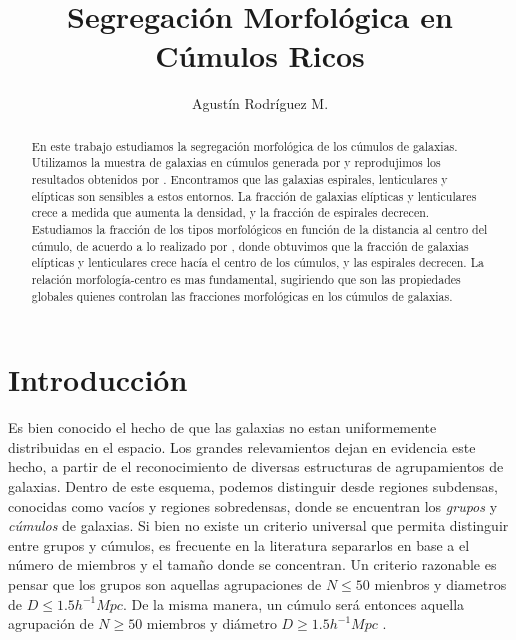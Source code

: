 \documentclass[a4paper,10pt]{article}
\title{Segregaci\'on Morfol\'ogica en C\'umulos Ricos}
\author{Agustín Rodríguez M.}
\begin{document}
\maketitle

\begin{abstract}

En este trabajo estudiamos la segregaci\'on morfol\'ogica de los c\'umulos de galaxias. Utilizamos la muestra de galaxias en c\'umulos generada por \citet{Dressler1980.catalogo} y reprodujimos los resultados obtenidos por \citet{Dressler1980}. Encontramos que las galaxias espirales, lenticulares y el\'ipticas son sensibles a estos entornos. La fracci\'on de galaxias el\'ipticas y lenticulares crece a medida que aumenta la densidad, y la fracci\'on de espirales decrecen.
Estudiamos la fracci\'on de los tipos morfol\'ogicos en funci\'on de la distancia al centro del c\'umulo, de acuerdo a lo realizado por \citet{Whitmore1993}, donde obtuvimos que la fracci\'on de galaxias el\'ipticas y lenticulares crece hac\'ia el centro de los c\'umulos, y las espirales decrecen. La relaci\'on morfología-centro es mas fundamental, sugiriendo que son las propiedades globales quienes controlan las fracciones morfol\'ogicas en los c\'umulos de galaxias.
\end{abstract}



\section{Introducci\'on}

Es bien conocido el hecho de que las galaxias no estan uniformemente distribuidas en el espacio. Los grandes relevamientos dejan en evidencia este hecho, a partir de el reconocimiento de diversas estructuras de agrupamientos de galaxias. Dentro de este esquema, podemos distinguir desde regiones subdensas, conocidas como vac\'ios y regiones sobredensas, donde se encuentran los \textit{grupos} y \textit{c\'umulos} de galaxias. Si bien no existe un criterio universal que permita distinguir entre grupos y c\'umulos, es frecuente en la literatura separarlos en base a el n\'umero de miembros y el tama\~no donde se concentran. Un criterio razonable es pensar que los grupos son aquellas agrupaciones de $N\leq50$ mienbros y diametros de $D\leq1.5h^{-1}Mpc$. De la misma manera, un c\'umulo ser\'a entonces aquella agrupaci\'on de $N\geq50$ miembros y di\'ametro $D\geq1.5h^{-1}Mpc$ \citep{Schneider}.
\end{document}
